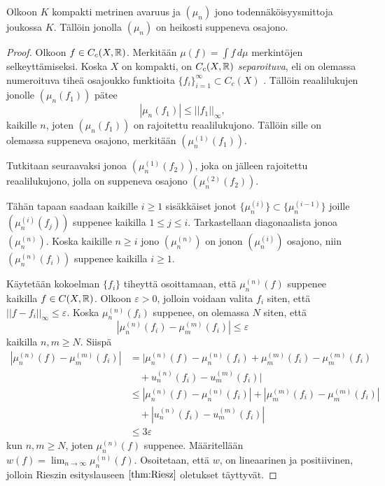 \documentclass[12pt,oneside,a4paper]{amsbook} %
\begin{document}
\begin{theorem}\label{thm:probmeasureconvergence}
    Olkoon $K$ kompakti metrinen avaruus ja $(\mu_n)$ jono todennäköisyysmittoja joukossa $K$. Tällöin jonolla $(\mu_n)$ on heikosti suppeneva osajono.
\end{theorem}
\begin{proof}
    Olkoon $f \in C_c(X, \mathbb{R})$. Merkitään $\mu(f) = \int f \, d\mu$ merkintöjen selkeyttämiseksi. Koska $X$ on kompakti, on $C_c(X, \mathbb{R})$ \textit{separoituva}, eli on olemassa numeroituva tiheä osajoukko funktioita $\{f_i\}_{i = 1}^\infty \subset C_c(X)$ \cite[s. 140]{conway}. Tällöin reaalilukujen jonolle $(\mu_n(f_1))$ pätee
    \begin{equation}
        |\mu_n(f_1)| \le ||f_1||_\infty,
    \end{equation}
    kaikille $n$, joten $(\mu_n(f_1))$ on rajoitettu reaalilukujono. Tällöin sille on olemassa suppeneva osajono, merkitään $(\mu_n^{(1)}(f_1))$.
    
    Tutkitaan seuraavaksi jonoa $(\mu_n^{(1)}(f_2))$, joka on jälleen rajoitettu reaalilukujono, jolla on suppeneva osajono $(\mu_n^{(2)}(f_2))$.
    
    Tähän tapaan saadaan kaikille $i \ge 1$ sisäkkäiset jonot $\{\mu_n^{(i)}\} \subset \{\mu_n^{(i-1)}\}$ joille $(\mu_n^{(i)}(f_j))$ suppenee kaikilla $1 \le j \le i$. Tarkastellaan diagonaalista jonoa $(\mu_n^{(n)})$. Koska kaikille $n \ge i$ jono $(\mu_n^{(n)})$ on jonon $(\mu_n^{(i)})$ osajono, niin $(\mu_n^{(n)}(f_i))$ suppenee kaikilla $i \ge 1$.
    
    Käytetään kokoelman $\{f_i\}$ tiheyttä osoittamaan, että $\mu_n^{(n)}(f)$ suppenee kaikilla $f \in C(X, \mathbb{R})$. Olkoon $\varepsilon > 0$, jolloin voidaan valita $f_i$ siten, että $||f-f_i||_\infty \le \varepsilon.$ Koska $\mu_n^{(n)}(f_i)$ suppenee, on olemassa $N$ siten, että 
    \begin{equation*}
        |\mu_n^{(n)}(f_i) - \mu_m^{(m)}(f_i)|\le \varepsilon
    \end{equation*}
    kaikilla $n, m \ge N$. Siispä
    \begin{align*}
        |\mu_n^{(n)}(f) - \mu_m^{(m)}(f_i)| &=  |\mu_n^{(n)}(f) - \mu_n^{(n)}(f_i) + \mu_m^{(m)}(f_i) - \mu_m^{(m)}(f_i) \\ &\quad  + u_n^{(n)}(f_i) - u_m^{(m)}(f_i) | \\
        &\le |\mu_n^{(n)}(f) - \mu_n^{(n)}(f_i)| + |\mu_m^{(m)}(f_i) - \mu_m^{(m)}(f_i)| \\ &\quad  + |u_n^{(n)}(f_i) - u_m^{(m)}(f_i) | \\
        &\le 3\varepsilon
    \end{align*}
    kun $n, m \ge N$, joten $\mu_n^{(n)}(f)$ suppenee. Määritellään $w(f) = \lim_{n \to \infty} \mu_n^{(n)}(f)$. Osoitetaan, että $w$, on lineaarinen ja positiivinen, jolloin Rieszin esityslauseen $\ref{thm:Riesz}$ oletukset täyttyvät. 
    

\end{proof}
\end{document}
